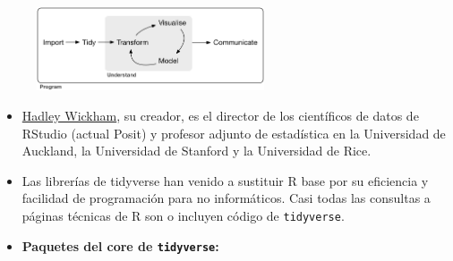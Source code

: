 \documentclass[
  letterpaper,
  DIV=11,
  numbers=noendperiod]{scrreprt}
\begin{document}
\begin{figure}

{\centering \includegraphics[width=0.6\textwidth,height=\textheight]{Figuras/data-science.png}

}

\end{figure}

\begin{itemize}
\item
  \href{https://hadley.nz/}{Hadley Wickham}, su creador, es el director
  de los científicos de datos de RStudio (actual Posit) y profesor
  adjunto de estadística en la Universidad de Auckland, la Universidad
  de Stanford y la Universidad de Rice.
\item
  Las librerías de tidyverse han venido a sustituir R base por su
  eficiencia y facilidad de programación para no informáticos. Casi
  todas las consultas a páginas técnicas de R son o incluyen código de
  \texttt{tidyverse}.
\item
  \textbf{Paquetes del core de \texttt{tidyverse}:}


\end{itemize}
\end{document}
